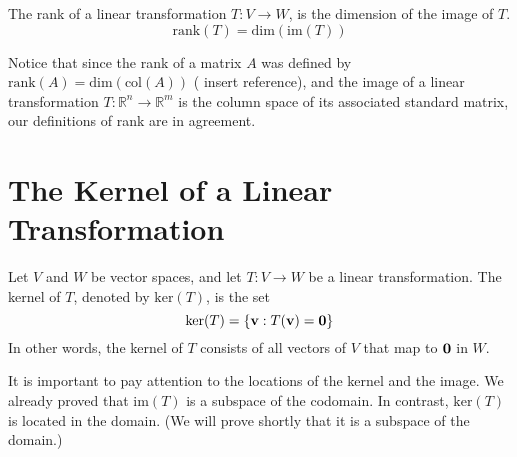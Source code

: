 \documentclass{ximera}
\renewcommand{\vec}[1]{{\bf #1}}
\newcommand{\RR}{\mathbb{R}}
\begin{document}
\begin{definition}\label{def:rankofT}
The rank of a linear transformation $T:V\rightarrow W$, is the dimension of the image of $T$.
$$\text{rank}(T)=\text{dim}(\text{im}(T))$$
\end{definition}

Notice that since the rank of a matrix $A$ was defined by $\text{rank}(A) = \text{dim}(\text{col}(A))$ ({\color{red} insert reference}), and the image of a linear transformation $T:\RR^n\rightarrow \RR^m$ is the column space of its associated standard matrix, our definitions of rank are in agreement.

\section*{The Kernel of a Linear Transformation}

\begin{definition}
Let $V$ and $W$ be vector spaces, and let $T:V\rightarrow W$ be a linear transformation.  The kernel of $T$, denoted by $\text{ker}(T)$, is the set
$$\text{ker}(T)=\{\vec{v}:T(\vec{v})=\vec{0}\}$$
In other words, the kernel of $T$ consists of all vectors of $V$ that map to $\vec{0}$ in $W$.
\end{definition}
It is important to pay attention to the locations of the kernel and the image.  We already proved that $\text{im}(T)$ is a subspace of the codomain.  In contrast, $\text{ker}(T)$ is located in the domain.  (We will prove shortly that it is a subspace of the domain.)

\begin{image}
\end{image}
\end{document}
